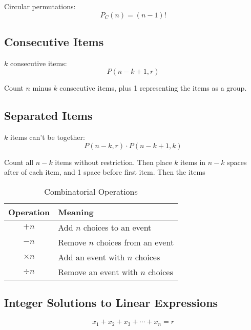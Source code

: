 \documentclass{article}
\begin{document}
    Circular permutations: \begin{equation}
        P_C(n) = (n - 1)!
    \end{equation}

    \subsection{Consecutive Items}

    $k$ consecutive items: \begin{equation}
        P(n - k + 1, r)
    \end{equation}

    Count $n$ minus $k$ consecutive items, plus 1 representing the items as a group.

    \subsection{Separated Items}

    $k$ items can't be together: \begin{equation}
        P(n - k, r) \cdot P(n - k + 1, k)
    \end{equation}

    Count all $n - k$ items without restriction. Then place $k$ items in $n - k$ spaces after of each item, and 1 space before first item. Then the items

    \begin{table}[h]
        \caption{Combinatorial Operations}
        \centering
        \begin{tabular}{cl}
            \toprule
            Operation & Meaning \\
            \midrule
            $+ n$ & Add $n$ choices to an event \\
            $- n$ & Remove $n$ choices from an event \\
            $\times n$ & Add an event with $n$ choices \\
            $\div n$ & Remove an event with $n$ choices \\
            \bottomrule
        \end{tabular}
    \end{table}

    \subsection{Integer Solutions to Linear Expressions}

    $$x_1 + x_2 + x_3 + \cdots + x_n = r$$
    
\end{document}
